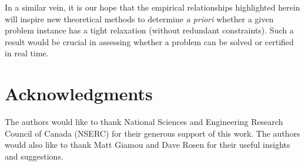 \documentclass[lettersize,journal]{IEEEtran}
\begin{document}
In a similar vein, it is our hope that the empirical relationships highlighted herein will inspire new theoretical methods to determine \emph{a priori} whether a given problem instance has a tight relaxation (without redundant constraints)\cite{carloneEstimationContractsOutlierRobust2022}. Such a result would be crucial in assessing whether a problem can be solved or certified in real time. 

\section{Acknowledgments}

The authors would like to thank National Sciences and Engineering Research Council of Canada (NSERC) for their generous support of this work. The authors would also like to thank Matt Giamou and Dave Rosen for their useful insights and suggestions.
 


\end{document}
